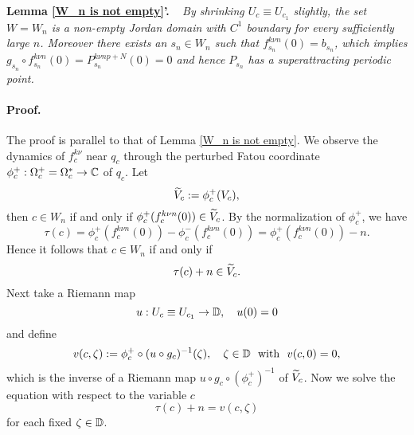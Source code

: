 \medskip



\noin
{\bf Lemma \ref{W_n is not empty}'.} \
{\it
By shrinking $U_c \equiv U_{c_1}$ slightly, the set $W=W_n$ is a non-empty
Jordan domain with $C^1$ boundary for every 
sufficiently large $n$. Moreover there 
exists an $s_n \in W_n$ such that $f_{s_n}^{k\nu n}(0) = b_{s_n}$,
which implies $g_{s_n} \circ f_{s_n}^{k\nu n}(0) = P_{s_n}^{k\nu np+N}(0) = 0$ 
and hence $P_{s_n}$ has a superattracting periodic point. 
\label{W_n is not empty for parabolic case}
}




\medskip


\paragraph{\bf Proof.}
The proof is parallel to that of Lemma \ref{W_n is not empty}. 
We observe the dynamics of $f_c^{k\nu}$ near $q_c$ through
the perturbed Fatou coordinate 
$\phi_c^+ : \Omega_c^+=\Omega_c^\ast \to \mathbb C$ of $q_c$. 
Let
$$
  \widetilde{V}_c := \phi_c^+(V_c),
$$
then $c \in W_n$ if and only if $\phi_c^+(f_c^{k\nu n}(0)) \in \widetilde{V}_c$.
By the normalization of $\phi_c^+$, we have
$$
  \tau(c) = \phi_c^+(f_c^{k\nu n}(0)) - \phi_c^-(f_c^{k\nu n}(0))
= \phi_c^+(f_c^{k\nu n}(0)) - n.
$$
Hence it follows that $c \in W_n$ if and only if 
$$
  \tau(c) + n \in \widetilde{V}_c.
$$
Next take a Riemann map
$$
  u : U_c \equiv U_{c_1} \to \mathbb D, \quad u(0) = 0
$$
and define
$$
  v(c, \zeta) := \phi_c^+ \circ (u \circ g_c)^{-1}(\zeta), \quad 
  \zeta \in \mathbb D \ \text{ with } \ v(c, 0)=0, 
$$
which is the inverse of a Riemann map $u \circ g_c \circ (\phi_c^+)^{-1}$
of $\widetilde{V}_c$. 
Now we solve the equation with respect to the variable $c$
\begin{equation}
  \tau(c)+n = v(c,\zeta)
\label{eqn for v(c,zeta) for parabolic case}
\end{equation}
for each fixed $\zeta \in \mathbb D$. 



